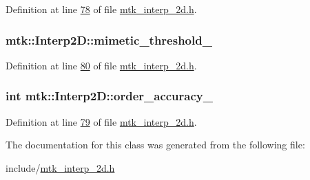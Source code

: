 Definition at line \hyperlink{mtk__interp__2d_8h_source_l00078}{78} of file \hyperlink{mtk__interp__2d_8h_source}{mtk\-\_\-interp\-\_\-2d.\-h}.

\hypertarget{classmtk_1_1Interp2D_a842cfa59a56be76a240dd5de68007134}{
\subsubsection[{mimetic\-\_\-threshold\-\_\-}]{ mtk\-::\-Interp2\-D\-::mimetic\-\_\-threshold\-\_\-\hspace{0.3cm}{\ttfamily [private]}}}\label{classmtk_1_1Interp2D_a842cfa59a56be76a240dd5de68007134}


Definition at line \hyperlink{mtk__interp__2d_8h_source_l00080}{80} of file \hyperlink{mtk__interp__2d_8h_source}{mtk\-\_\-interp\-\_\-2d.\-h}.

\hypertarget{classmtk_1_1Interp2D_ad83cea724e0eff1d8b14bcba3575612e}{
\subsubsection[{order\-\_\-accuracy\-\_\-}]{\setlength{\rightskip}{0pt plus 5cm}int mtk\-::\-Interp2\-D\-::order\-\_\-accuracy\-\_\-\hspace{0.3cm}{\ttfamily [private]}}}\label{classmtk_1_1Interp2D_ad83cea724e0eff1d8b14bcba3575612e}


Definition at line \hyperlink{mtk__interp__2d_8h_source_l00079}{79} of file \hyperlink{mtk__interp__2d_8h_source}{mtk\-\_\-interp\-\_\-2d.\-h}.



The documentation for this class was generated from the following file\-:\begin{DoxyCompactItemize}
\item 
include/\hyperlink{mtk__interp__2d_8h}{mtk\-\_\-interp\-\_\-2d.\-h}\end{DoxyCompactItemize}
